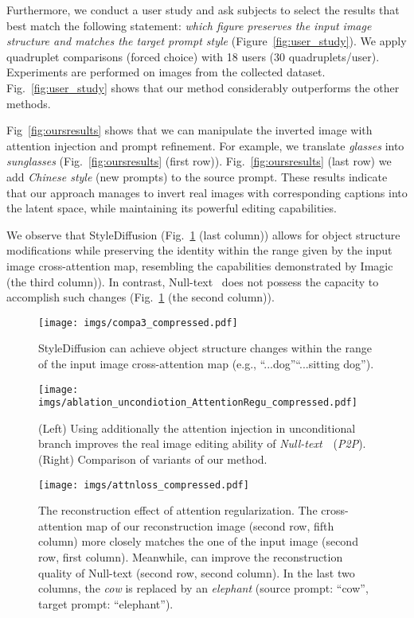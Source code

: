 \documentclass[twocolumn]{svjour3}          \smartqed  \usepackage{graphicx}
\begin{document}
Furthermore, we conduct a user study and ask subjects to select the results that best match the following statement: \textit{which figure preserves the input image structure and matches the target prompt style} (Figure~\ref{fig:user_study}). We apply quadruplet comparisons (forced choice) with 18 users (30 quadruplets/user). Experiments are performed on images from the collected dataset. Fig.~\ref{fig:user_study} shows that our method considerably outperforms the other methods.

Fig~\ref{fig:oursresults}  shows that we can manipulate the inverted image with attention injection and prompt refinement. For example, we translate  \textit{glasses}  into \textit{sunglasses} (Fig.~\ref{fig:oursresults} (first row)). Fig.~\ref{fig:oursresults} (last row)  we  add \textit{Chinese style} (new prompts) to the source prompt. These results indicate that our approach manages to invert real images with corresponding captions into the latent space, while maintaining its powerful editing capabilities.

We observe that StyleDiffusion (Fig.~\ref{fig:compa3} (last column)) allows for object structure modifications while preserving the identity within the range given by the input image cross-attention map, resembling the capabilities demonstrated by  Imagic~\citep{Kawar2022ImagicTR} (the third column)). In contrast, Null-text~\citep{mokady2022null} does not possess the capacity to accomplish such changes (Fig.~\ref{fig:compa3} (the second column)).

\begin{figure}[t]
    \centering
    \texttt{[image: imgs/compa3\_compressed.pdf]}
        \caption{StyleDiffusion can achieve object structure changes within the range of the input image cross-attention map (e.g., “...dog”“...sitting dog”).}
    \label{fig:compa3}
    \vspace{-5mm}
\end{figure}


\begin{figure*}[t]
\centering
\texttt{[image: imgs/ablation\_uncondiotion\_AttentionRegu\_compressed.pdf]}
        \caption{
        (Left) Using additionally the attention injection in unconditional branch improves the real image editing ability of \emph{Null-text}~\citep{mokady2022null}~(\emph{P2P}). (Right) Comparison of  variants of our method.}
    \label{fig:uncondselfattn_more}
\end{figure*}


\begin{figure*}[t]
    \centering
    \texttt{[image: imgs/attnloss\_compressed.pdf]}\vspace{-2mm}
        \caption{The reconstruction effect of attention regularization. The cross-attention map of our reconstruction image (second row, fifth column) more closely matches the one of the input image (second row, first column). Meanwhile,  can improve the reconstruction quality of Null-text (second row, second column). In the last two columns, the \emph{cow} is replaced by an \emph{elephant} (source prompt: “cow”, target prompt: “elephant”). }
    \label{fig:attnloss}
\end{figure*}
\end{document}

